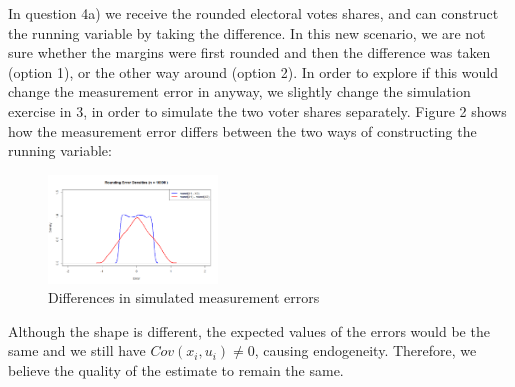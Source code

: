 \documentclass{scrartcl}
\begin{document}
In question 4a) we receive the rounded electoral votes shares, and can construct the running variable by taking the difference. In this new scenario, we are not sure whether the margins were first rounded and then the difference was taken (option 1), or the other way around (option 2). In order to explore if this would change the measurement error in anyway, we slightly change the simulation exercise in 3, in order to simulate the two voter shares separately. Figure 2 shows how the measurement error differs between the two ways of constructing the running variable: 


\begin{figure}[htbp]
    \centering
    \includegraphics[width=0.4\textwidth]{output/figures/rounding_error.png}
    \caption{Differences in simulated measurement errors}
    \label{fig:your_label}
\end{figure}

Although the shape is different, the expected values of the errors would be the same and we still have $Cov(x_i,u_i) \neq 0$, causing endogeneity. Therefore, we believe the quality of the estimate to remain the same. 
\end{document}
